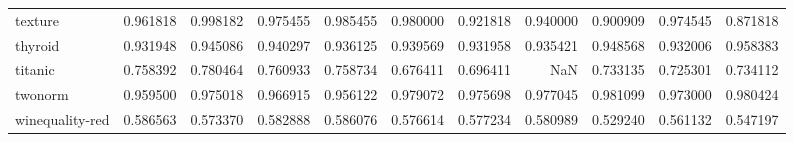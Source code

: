 \begin{tabular}{lrrrrrrrrrr}
texture         &   0.961818 &  0.998182 &  0.975455 &  0.985455 &  0.980000 &  0.921818 &  0.940000 &  0.900909 &  0.974545 &  0.871818 \\
thyroid         &   0.931948 &  0.945086 &  0.940297 &  0.936125 &  0.939569 &  0.931958 &  0.935421 &  0.948568 &  0.932006 &  0.958383 \\
titanic         &   0.758392 &  0.780464 &  0.760933 &  0.758734 &  0.676411 &  0.696411 &       NaN &  0.733135 &  0.725301 &  0.734112 \\
twonorm         &   0.959500 &  0.975018 &  0.966915 &  0.956122 &  0.979072 &  0.975698 &  0.977045 &  0.981099 &  0.973000 &  0.980424 \\
winequality-red &   0.586563 &  0.573370 &  0.582888 &  0.586076 &  0.576614 &  0.577234 &  0.580989 &  0.529240 &  0.561132 &  0.547197 \\
\bottomrule
\end{tabular}
